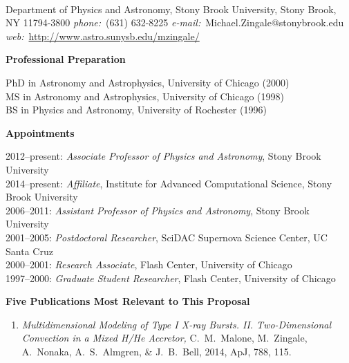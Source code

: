 \documentclass[11pt,letterpaper,english]{article}
\begin{document}
\setlength{\parindent}{0in} %



\\
{Department of Physics and Astronomy, Stony Brook University, Stony
  Brook, NY 11794-3800} \smallskip
{{\it phone:}~(631) 632-8225 \hskip 2mm
{\it e-mail:}~Michael.Zingale@stonybrook.edu \hskip 2mm \\[-0.25em]
{\it web:}~\url{http://www.astro.sunysb.edu/mzingale/}}

\begin{flushleft} {\bf Professional Preparation}
{\parindent 16pt

PhD in Astronomy and Astrophysics, University of Chicago (2000)\\ 
MS in Astronomy and Astrophysics, University of Chicago (1998)\\ 
BS in Physics and Astronomy, University of Rochester (1996)\\ 
}

\vspace{.04in}
{\bf Appointments}
{\parindent 16pt

2012--present: {\em Associate Professor of Physics and Astronomy}, Stony Brook University \\ 
2014--present: {\em Affiliate}, Institute for Advanced Computational Science, Stony Brook University \\ 
2006--2011:  {\em Assistant Professor of Physics and Astronomy}, Stony Brook University \\ 
2001--2005: {\em Postdoctoral Researcher}, SciDAC Supernova Science Center, UC Santa Cruz \\
2000--2001: {\em Research Associate}, Flash Center, University of Chicago \\
1997--2000: {\em Graduate Student Researcher}, Flash Center, University of Chicago 
}

\vspace{.04in}
{\bf Five Publications Most Relevant to This Proposal}
\vspace{-6pt}
\begin{enumerate} \itemsep1pt \parskip0pt 
\item {\it Multidimensional Modeling of Type I X-ray
  Bursts. II. Two-Dimensional Convection in a Mixed H/He Accretor, }
  C.~M.~Malone, M.~Zingale, A.~Nonaka, A.~S.~Almgren, \& J.~B.~Bell,
  2014, ApJ, 788, 115.


\end{enumerate}
\end{flushleft}
\end{document}
